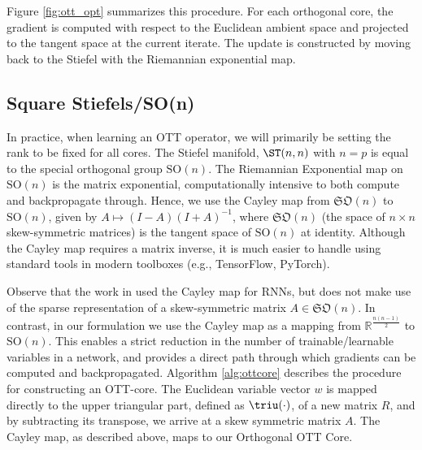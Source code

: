 Figure \ref{fig:ott_opt} summarizes this procedure. For each orthogonal core, the gradient is computed with respect to the Euclidean ambient space and projected to the tangent space at the current iterate. The update is constructed by moving back to the Stiefel with the Riemannian exponential map.

\subsection{Square Stiefels/SO(n)}
In practice, when learning an OTT operator, we will primarily be setting the rank to be fixed for all cores.
The Stiefel manifold, $\ST(n,n)$ with $n=p$ is equal to the special orthogonal group $\text{SO}(n)$.
The Riemannian Exponential map on $\text{SO}(n)$ is the matrix exponential, computationally intensive to both compute and backpropagate through.
Hence, we use the Cayley map from $\mathfrak{SO}(n)$ to $\text{SO}(n)$, given by $A \mapsto \left(I-A\right)\left(I+A\right)^{-1}$, where $\mathfrak{SO}(n)$ (the space of $n\times n$ skew-symmetric matrices) is the tangent space of $\text{SO}(n)$ at identity.
Although the Cayley map requires a matrix inverse, it is much easier to handle using standard tools
in modern toolboxes (e.g., TensorFlow, PyTorch).


 Observe that
the work in \cite{helfrich2017orthogonal} used the Cayley map for RNNs, but does not make use of the sparse representation of a skew-symmetric matrix $A \in \mathfrak{SO}(n)$.
In contrast, in our formulation we use the Cayley map as a mapping from $\mathbb{R}^{\frac{n(n-1)}{2}}$ to $\text{SO}(n)$. This enables a strict reduction in the number of trainable/learnable variables in a network, and provides a direct path through which gradients can be computed and backpropagated.
Algorithm \ref{alg:ottcore} describes the procedure for constructing an OTT-core.
The Euclidean variable vector $w$ is mapped directly to the upper triangular part, defined as $\triu(\cdot)$, of a new matrix $R$, and by subtracting its transpose,
we arrive at a skew symmetric matrix $A$. The Cayley map, as described above, maps to our Orthogonal OTT Core. 

